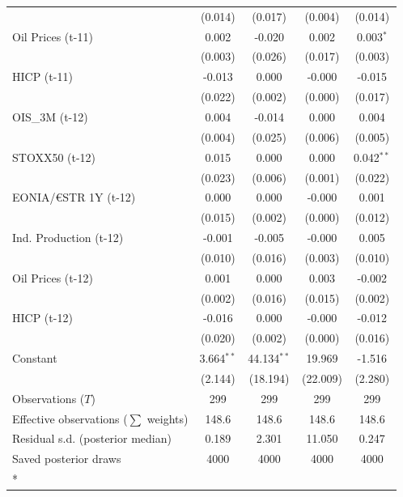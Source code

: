 \begin{longtable}[t]{lcccc}
 & (0.014) & (0.017) & (0.004) & (0.014)\\
Oil Prices (t-11) & 0.002 & -0.020 & 0.002 & 0.003$^{*}$\\
 & (0.003) & (0.026) & (0.017) & (0.003)\\
HICP (t-11) & -0.013 & 0.000 & -0.000 & -0.015\\
 & (0.022) & (0.002) & (0.000) & (0.017)\\
OIS\_3M (t-12) & 0.004 & -0.014 & 0.000 & 0.004\\
 & (0.004) & (0.025) & (0.006) & (0.005)\\
STOXX50 (t-12) & 0.015 & 0.000 & 0.000 & 0.042$^{**}$\\
 & (0.023) & (0.006) & (0.001) & (0.022)\\
EONIA/€STR 1Y (t-12) & 0.000 & 0.000 & -0.000 & 0.001\\
 & (0.015) & (0.002) & (0.000) & (0.012)\\
Ind. Production (t-12) & -0.001 & -0.005 & -0.000 & 0.005\\
 & (0.010) & (0.016) & (0.003) & (0.010)\\
Oil Prices (t-12) & 0.001 & 0.000 & 0.003 & -0.002\\
 & (0.002) & (0.016) & (0.015) & (0.002)\\
HICP (t-12) & -0.016 & 0.000 & -0.000 & -0.012\\
 & (0.020) & (0.002) & (0.000) & (0.016)\\
Constant & 3.664$^{**}$ & 44.134$^{**}$ & 19.969 & -1.516\\
 & (2.144) & (18.194) & (22.009) & (2.280)\\
\midrule
Observations ($T$) & 299 & 299 & 299 & 299\\
Effective observations ($\sum$ weights) & 148.6 & 148.6 & 148.6 & 148.6\\
Residual s.d. (posterior median) & 0.189 & 2.301 & 11.050 & 0.247\\
Saved posterior draws & 4000 & 4000 & 4000 & 4000\\*
\end{longtable}
\endgroup{}

